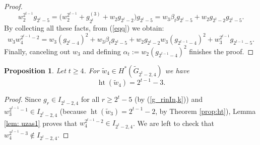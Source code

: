 \documentclass{amsart}
\newtheorem{proposition}[theorem]{Proposition}
\theoremstyle{definition}
\theoremstyle{remark}
\numberwithin{equation}{section}
\newcommand{\gr}{\widetilde G}
\newcommand{\w}{\widetilde w}
\newcommand{\htt}{\operatorname{ht}}
\renewcommand{\ge}{\geqslant}
\begin{document}
\begin{proof}
\[w_2^{2^{t-1}}g_{2^t-5}=\big(w_2^{2^{t-1}}+g_{2^t}^{(3)}+w_2g_{2^t-2}\big)g_{2^t-5}=w_3\beta_tg_{2^t-5}+w_2g_{2^t-2}g_{2^t-5}.\]
By collecting all these facts, from (\ref{eqq}) we obtain:
\[w_3w_4^{2^{t-1}-2}=w_3(g_{2^t-4})^2+w_3\beta_tg_{2^t-5}+w_2g_{2^t-2}w_3(g_{2^{t-1}-4})^2 + w_3^{2^{t-1}}g_{2^{t-1}-5}.\]
Finally, canceling out $w_3$ and defining $\alpha_t:=w_2(g_{2^{t-1}-4})^2$ finishes the proof.
\end{proof}





\begin{proposition}\label{prop:ht(w4)2^t-2}
     Let $t \ge 4$. For $\w_4 \in H^*(\gr_{2^t-2,4})$ we have
    \[\htt(\w_4) = 2^{t-1}-3.\]
\end{proposition}

\begin{proof}
Since $g_r\in I_{2^t-2,4}$ for all $r\ge2^t-5$ (by (\ref{g_rinIn,k})) and $w_3^{2^{t-1}-1}\in I_{2^t-2,4}$ (because $\htt(\w_3)=2^{t-1}-2$, by Theorem \ref{prop:ht}), Lemma \ref{lem: uzas1} proves that $w_4^{2^{t-1}-2}\in I_{2^t-2,4}$. We are left to check that $w_4^{2^{t-1}-3}\notin I_{2^t-2,4}$.


\end{proof}
\end{document}
